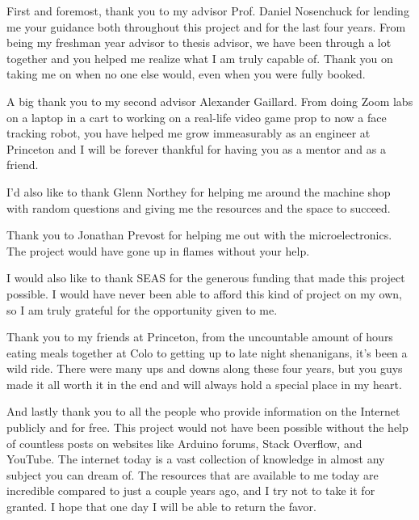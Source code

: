 First and foremost, thank you to my advisor Prof. Daniel Nosenchuck for lending me your guidance both throughout this project and for the last four years. From being my freshman year advisor to thesis advisor, we have been through a lot together and you helped me realize what I am truly capable of. Thank you on taking me on when no one else would, even when you were fully booked.

A big thank you to my second advisor Alexander Gaillard. From doing Zoom labs on a laptop in a cart to working on a real-life video game prop to now a face tracking robot, you have helped me grow immeasurably as an engineer at Princeton and I will be forever thankful for having you as a mentor and as a friend.

I'd also like to thank Glenn Northey for helping me around the machine shop with random questions and giving me the resources and the space to succeed.

Thank you to Jonathan Prevost for helping me out with the microelectronics. The project would have gone up in flames without your help.

I would also like to thank SEAS for the generous funding that made this project possible. I would have never been able to afford this kind of project on my own, so I am truly grateful for the opportunity given to me.

Thank you to my friends at Princeton, from the uncountable amount of hours eating meals together at Colo to getting up to late night shenanigans, it's been a wild ride. There were many ups and downs along these four years, but you guys made it all worth it in the end and will always hold a special place in my heart.

And lastly thank you to all the people who provide information on the Internet publicly and for free. This project would not have been possible without the help of countless posts on websites like Arduino forums, Stack Overflow, and YouTube. The internet today is a vast collection of knowledge in almost any subject you can dream of. The resources that are available to me today are incredible compared to just a couple years ago, and I try not to take it for granted. I hope that one day I will be able to return the favor.